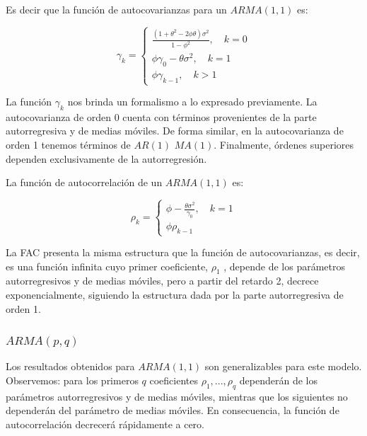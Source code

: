 \documentclass[a4paper,10pt]{article}
\begin{document}
Es decir que la función de autocovarianzas para un $ARMA(1,1)$ es:

\begin{equation*}
\gamma_k= \left\{ \begin{array}{lcc}
             \frac{(1+\theta^2 -2\phi\theta) \sigma^2}{1-\phi^2} , \quad k=0 \\
             \phi \gamma_0 - \theta \sigma^2 , \quad k=1 \\
             \phi \gamma_{k-1} , \quad k>1
             \end{array}
   \right.
\end{equation*}


La función $\gamma_k$ nos brinda un formalismo a lo expresado previamente. La autocovarianza de orden 0 cuenta con términos provenientes de la parte autorregresiva y de medias móviles. De forma similar, en la autocovarianza de orden 1 tenemos términos de $AR(1)$ $MA(1)$. Finalmente, órdenes superiores dependen exclusivamente de la autorregresión.

La función de autocorrelación de un $ARMA(1,1)$ es:

\begin{equation*}
\rho_k= \left\{ \begin{array}{lcc}
             \phi - \frac{\theta \sigma^2}{\gamma_0} , \quad k=1 \\
             \phi \rho_{k-1}
             \end{array}
   \right.
\end{equation*}

La FAC presenta la misma estructura que la función de autocovarianzas, es decir, es una función
infinita cuyo primer coeficiente, $\rho_1$ , depende de los parámetros autorregresivos y de medias
móviles, pero a partir del retardo 2, decrece exponencialmente, siguiendo la estructura dada
por la parte autorregresiva de orden 1.

\subsubsection{$ARMA(p,q)$}

Los resultados obtenidos para $ARMA(1,1)$ son generalizables para este modelo. Observemos: para los primeros $q$ coeficientes $\rho_1, ..., \rho_q$ dependerán de los parámetros autorregresivos y de medias móviles, mientras que los siguientes no dependerán del parámetro de medias móviles. En consecuencia, la función de autocorrelación decrecerá rápidamente a cero.
\end{document}
